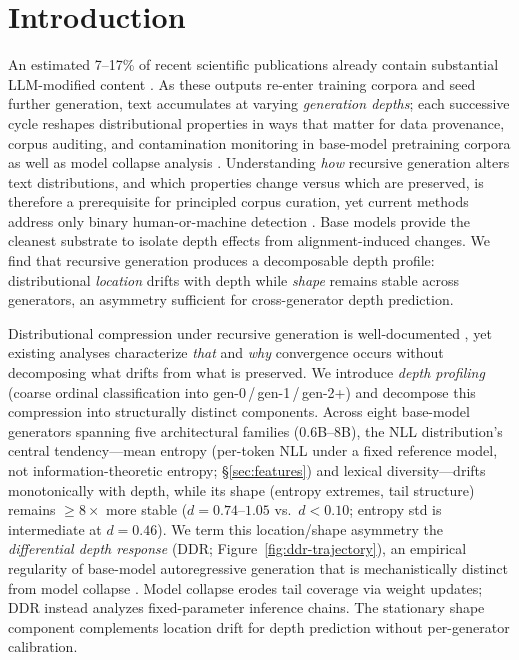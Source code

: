 \section{Introduction}
\label{sec:introduction}

 An estimated 7--17\% of recent scientific publications already contain substantial LLM-modified content \cite{mapping_llm_science,monitoring_ai_review}. As these outputs re-enter training corpora \cite{dolma,fineweb} and seed further generation, text accumulates at varying \emph{generation depths}; each successive cycle reshapes distributional properties in ways that matter for data provenance, corpus auditing, and contamination monitoring in base-model pretraining corpora \cite{ccnet,dsir} as well as model collapse analysis \cite{curse_of_recursion,strong_model_collapse}. Understanding \emph{how} recursive generation alters text distributions, and which properties change versus which are preserved, is therefore a prerequisite for principled corpus curation, yet current methods address only binary human-or-machine detection \cite{detectgpt,fast_detectgpt,binoculars,ld_score}.
Base models provide the cleanest substrate to isolate depth effects from alignment-induced changes.
We find that recursive generation produces a decomposable depth profile: distributional \emph{location} drifts with depth while \emph{shape} remains stable across generators, an asymmetry sufficient for cross-generator depth prediction.

 Distributional compression under recursive generation is well-documented \cite{curious_decline,broken_telephone,markovian_chains}, yet existing analyses characterize \emph{that} and \emph{why} convergence occurs without decomposing what drifts from what is preserved.
We introduce \emph{depth profiling} (coarse ordinal classification into gen-0\,/\,gen-1\,/\,gen-2+) and decompose this compression into structurally distinct components.
Across eight base-model generators spanning five architectural families (0.6B--8B), the NLL distribution's central tendency---mean entropy (per-token NLL under a fixed reference model, not information-theoretic entropy; \S\ref{sec:features}) and lexical diversity---drifts monotonically with depth, while its shape (entropy extremes, tail structure) remains ${\geq}8{\times}$ more stable ($d{=}0.74$--$1.05$ vs.\ $d < 0.10$; entropy std is intermediate at $d{=}0.46$).
We term this location/shape asymmetry the \emph{differential depth response} (DDR; Figure~\ref{fig:ddr-trajectory}), an empirical regularity of base-model autoregressive generation that is mechanistically distinct from model collapse \cite{curse_of_recursion}. Model collapse erodes tail coverage via weight updates; DDR instead analyzes fixed-parameter inference chains.
The stationary shape component complements location drift for depth prediction without per-generator calibration.

